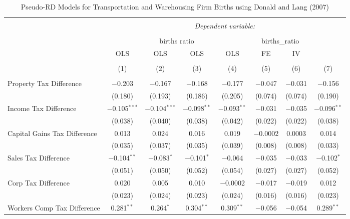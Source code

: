 
\begin{table}[!htbp] \centering 
  \caption{Pseudo-RD Models for  Transportation and Warehousing Firm Births using Donald and Lang (2007)} 
  \label{} 
\begin{tabular}{@{\extracolsep{5pt}}lccccccc} 
\\[-1.8ex]\hline 
\hline \\[-1.8ex] 
 & \multicolumn{7}{c}{\textit{Dependent variable:}} \\ 
\cline{2-8} 
\\[-1.8ex] & \multicolumn{4}{c}{births ratio} & \multicolumn{2}{c}{births\_ratio} &   \\ 
 & OLS & OLS & OLS & OLS & FE & IV &  \\ 
\\[-1.8ex] & (1) & (2) & (3) & (4) & (5) & (6) & (7)\\ 
\hline \\[-1.8ex] 
 Property Tax Difference & $-$0.203 & $-$0.167 & $-$0.168 & $-$0.177 & $-$0.047 & $-$0.031 & $-$0.156 \\ 
  & (0.180) & (0.193) & (0.186) & (0.205) & (0.074) & (0.074) & (0.190) \\ 
  Income Tax Difference & $-$0.105$^{***}$ & $-$0.104$^{***}$ & $-$0.098$^{**}$ & $-$0.093$^{**}$ & $-$0.031 & $-$0.035 & $-$0.096$^{**}$ \\ 
  & (0.038) & (0.040) & (0.038) & (0.042) & (0.022) & (0.022) & (0.038) \\ 
  Capital Gains Tax Difference & 0.013 & 0.024 & 0.016 & 0.019 & $-$0.0002 & 0.0003 & 0.014 \\ 
  & (0.035) & (0.037) & (0.035) & (0.039) & (0.008) & (0.008) & (0.033) \\ 
  Sales Tax Difference & $-$0.104$^{**}$ & $-$0.083$^{*}$ & $-$0.101$^{*}$ & $-$0.064 & $-$0.035 & $-$0.033 & $-$0.102$^{*}$ \\ 
  & (0.051) & (0.050) & (0.052) & (0.054) & (0.027) & (0.027) & (0.052) \\ 
  Corp Tax Difference & 0.020 & 0.005 & 0.010 & $-$0.0002 & $-$0.017 & $-$0.019 & 0.012 \\ 
  & (0.023) & (0.024) & (0.023) & (0.024) & (0.016) & (0.016) & (0.023) \\ 
  Workers Comp Tax Difference & 0.281$^{**}$ & 0.264$^{*}$ & 0.304$^{**}$ & 0.309$^{**}$ & $-$0.056 & $-$0.054 & 0.289$^{**}$ \\ 

\end{tabular}
\end{table}
